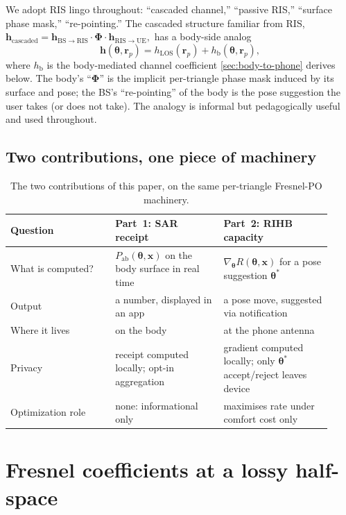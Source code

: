 \documentclass[11pt,a4paper]{article}
\theoremstyle{definition}
\newcommand{\rr}{\mathbf{r}}
\newcommand{\Phimat}{\mathbf{\Phi}}
\newcommand{\hh}{\mathbf{h}}
\newcommand{\xvec}{\mathbf{x}}
\newcommand{\thetab}{\bm{\theta}}
\newcommand{\Pabs}{P_{\mathrm{ab}}}
\newcommand{\hbody}{h_{\mathrm{b}}}
\newcommand{\hLOS}{h_{\mathrm{LOS}}}
\begin{document}
We adopt RIS lingo throughout: ``cascaded channel,''
``passive RIS,'' ``surface phase mask,'' ``re-pointing.''  The
cascaded structure familiar from RIS,
\(
  \hh_{\mathrm{cascaded}} = \hh_{\mathrm{BS\to RIS}}\cdot
  \Phimat\cdot\hh_{\mathrm{RIS\to UE}},
\)
has a body-side analog
\begin{equation}\label{eq:cascaded-body}
  \hh(\thetab,\rr_p)=\hLOS(\rr_p)+\hbody(\thetab,\rr_p),
\end{equation}
where $\hbody$ is the body-mediated channel coefficient
\cref{sec:body-to-phone} derives below.  The body's
``$\Phimat$'' is the implicit per-triangle phase mask induced by
its surface and pose; the BS's ``re-pointing'' of the body is the
pose suggestion the user takes (or does not take).  The analogy
is informal but pedagogically useful and used throughout.

\subsection{Two contributions, one piece of machinery}

\begin{table}[h]
\caption{The two contributions of this paper, on the same per-triangle
Fresnel-PO machinery.}
\label{tab:two-parts}
\centering\small
\begin{tabular}{@{}p{0.30\linewidth}p{0.31\linewidth}p{0.31\linewidth}@{}}
\toprule
\textbf{Question} & \textbf{Part~1: SAR receipt} &
\textbf{Part~2: RIHB capacity} \\
\midrule
What is computed? &
$\Pabs(\thetab,\xvec)$ on the body surface in real time &
$\nabla_{\thetab} R(\thetab,\xvec)$ for a pose suggestion $\thetab^*$ \\
Output & a number, displayed in an app & a pose move, suggested via
notification \\
Where it lives & on the body & at the phone antenna \\
Privacy & receipt computed locally; opt-in aggregation &
gradient computed locally; only $\thetab^*$ accept/reject leaves
device \\
Optimization role & none: informational only &
maximises rate under comfort cost only \\
\bottomrule
\end{tabular}
\end{table}

\section{Fresnel coefficients at a lossy half-space}\label{sec:fresnel}
\end{document}
